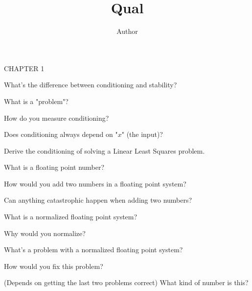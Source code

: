 \documentclass[12pt]{article}
\newenvironment{problem}[2][Problem]{\begin{trivlist}
\item[\hskip \labelsep {\bfseries #1}\hskip \labelsep {\bfseries #2.}]}{\end{trivlist}}
\begin{document}
 
 
\title{Qual}
\author{Author}
\maketitle
 
 CHAPTER 1
 
\begin{problem}{}
What's the difference between conditioning and stability?
\end{problem}

\begin{problem}{}
What is a "problem"?
\end{problem}

\begin{problem}{}
How do you measure conditioning?
\end{problem}
\begin{problem}{}
Does conditioning always depend on "$x$" (the input)?
\end{problem}
\begin{problem}{}
Derive the conditioning of solving a Linear Least Squares problem.
\end{problem}

\begin{problem}{}
What is a floating point number?
\end{problem}
\begin{problem}{}
How would you add two numbers in a floating point system?
\end{problem}
\begin{problem}{}
Can anything catastrophic happen when adding two numbers?
\end{problem}
What is a normalized floating point system?
\begin{problem}{}
Why would you normalize?
\end{problem}
\begin{problem}{}
What's a problem with a normalized floating point system?
\end{problem}
\begin{problem}{}
How would you fix this problem?
\end{problem}

\begin{problem}{}
(Depends on getting the last two problems correct)  What kind of number is this?
\end{problem}
\end{document}
